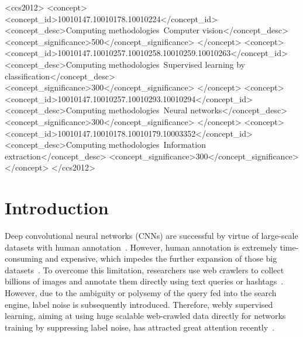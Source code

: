 \documentclass[sigconf]{acmart}
\begin{document}
\begin{CCSXML}
	<ccs2012>
	<concept>
	<concept_id>10010147.10010178.10010224</concept_id>
	<concept_desc>Computing methodologies~Computer vision</concept_desc>
	<concept_significance>500</concept_significance>
	</concept>
	<concept>
	<concept_id>10010147.10010257.10010258.10010259.10010263</concept_id>
	<concept_desc>Computing methodologies~Supervised learning by classification</concept_desc>
	<concept_significance>300</concept_significance>
	</concept>
	<concept>
	<concept_id>10010147.10010257.10010293.10010294</concept_id>
	<concept_desc>Computing methodologies~Neural networks</concept_desc>
	<concept_significance>300</concept_significance>
	</concept>
	<concept>
	<concept_id>10010147.10010178.10010179.10003352</concept_id>
	<concept_desc>Computing methodologies~Information extraction</concept_desc>
	<concept_significance>300</concept_significance>
	</concept>
	</ccs2012>
\end{CCSXML}





\maketitle

\section{Introduction}
\label{sec:introduction}
Deep convolutional neural networks (CNNs) are successful by virtue of large-scale datasets with human annotation~\cite{lecun2015deep}. However, human annotation is extremely time-consuming and expensive, which impedes the further expansion of those big datasets~\cite{waldrop2019news}. 
To overcome this limitation, researchers use web crawlers to collect billions of images and annotate them directly using text queries or hashtags~\cite{mahajan2018instagram,krasin2017openimages}. 
However, due to the ambiguity or polysemy of the query fed into the search engine, label noise is subsequently introduced.
Therefore, webly supervised learning, aiming at using huge scalable web-crawled data directly for networks training by suppressing label noise, has attracted great attention recently~\cite{algan2019image}.
\end{document}

